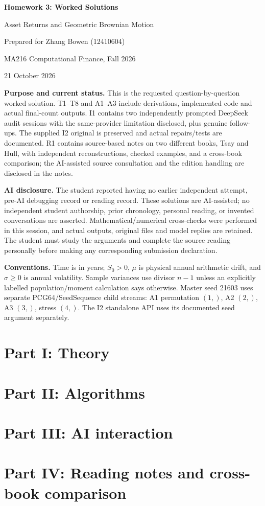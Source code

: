 \documentclass[11pt,a4paper]{article}
\begin{document}
\begin{center}
{\LARGE\bfseries Homework 3: Worked Solutions}\par
{\large Asset Returns and Geometric Brownian Motion}\par
Prepared for Zhang Bowen (12410604)\par
MA216 Computational Finance, Fall 2026\par
21 October 2026
\end{center}
\textbf{Purpose and current status.} This is the requested question-by-question worked solution. T1--T8 and A1--A3 include derivations, implemented code and actual final-count outputs. I1 contains two independently prompted DeepSeek audit sessions with the same-provider limitation disclosed, plus genuine follow-ups. The supplied I2 original is preserved and actual repairs/tests are documented. R1 contains source-based notes on two different books, Tsay and Hull, with independent reconstructions, checked examples, and a cross-book comparison; the AI-assisted source consultation and the edition handling are disclosed in the notes.

\textbf{AI disclosure.} The student reported having no earlier independent attempt, pre-AI debugging record or reading record. These solutions are AI-assisted; no independent student authorship, prior chronology, personal reading, or invented conversations are asserted. Mathematical/numerical cross-checks were performed in this session, and actual outputs, original files and model replies are retained. The student must study the arguments and complete the source reading personally before making any corresponding submission declaration.

\textbf{Conventions.} Time is in years; $S_0>0$, $\mu$ is physical annual arithmetic drift, and $\sigma\geq0$ is annual volatility. Sample variances use divisor $n-1$ unless an explicitly labelled population/moment calculation says otherwise. Master seed 21603 uses separate PCG64/SeedSequence child streams: A1 permutation $(1,)$, A2 $(2,)$, A3 $(3,)$, stress $(4,)$. The I2 standalone API uses its documented seed argument separately.
\clearpage
\tableofcontents
\clearpage
\section{Part I: Theory}

\clearpage
\section{Part II: Algorithms}

\clearpage
\section{Part III: AI interaction}

\clearpage
\section{Part IV: Reading notes and cross-book comparison}
{\small

}
\end{document}
